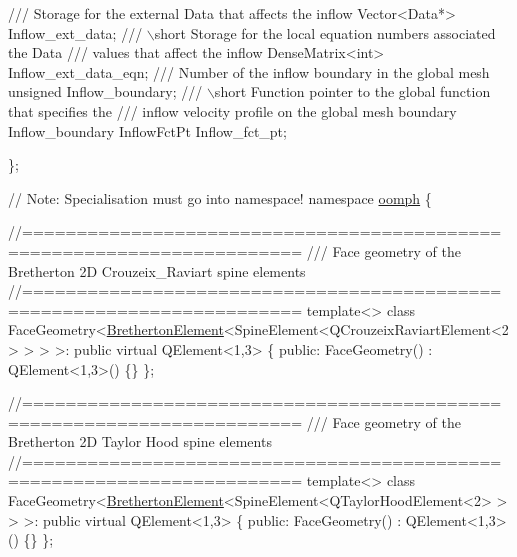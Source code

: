 \begin{DoxyCodeInclude}
\textcolor{comment}{}
\textcolor{comment}{ /// Storage for the external Data that affects the inflow}
\textcolor{comment}{} Vector<Data*> Inflow\_ext\_data;
\textcolor{comment}{}
\textcolor{comment}{ /// \(\backslash\)short Storage for the local equation numbers associated the Data}
\textcolor{comment}{ /// values that affect the inflow}
\textcolor{comment}{} DenseMatrix<int> Inflow\_ext\_data\_eqn;
\textcolor{comment}{}
\textcolor{comment}{ /// Number of the inflow boundary in the global mesh}
\textcolor{comment}{} \textcolor{keywordtype}{unsigned} Inflow\_boundary;
\textcolor{comment}{}
\textcolor{comment}{ /// \(\backslash\)short Function pointer to the global function that specifies the}
\textcolor{comment}{ /// inflow velocity profile on the global mesh boundary Inflow\_boundary}
\textcolor{comment}{} InflowFctPt Inflow\_fct\_pt;

\};



\textcolor{comment}{// Note: Specialisation must go into namespace!}
\textcolor{keyword}{namespace }\hyperlink{namespaceoomph}{oomph}
\{

\textcolor{comment}{//=======================================================================}\textcolor{comment}{}
\textcolor{comment}{/// Face geometry of the Bretherton 2D Crouzeix\_Raviart spine elements}
\textcolor{comment}{}\textcolor{comment}{//=======================================================================}
\textcolor{keyword}{template}<>
\textcolor{keyword}{class }FaceGeometry<\hyperlink{classBrethertonElement}{BrethertonElement}<SpineElement<QCrouzeixRaviartElement<2> > > >: \textcolor{keyword}{public}
       \textcolor{keyword}{virtual} QElement<1,3>
\{
  \textcolor{keyword}{public}:
 FaceGeometry() : QElement<1,3>() \{\}
\};



\textcolor{comment}{//=======================================================================}\textcolor{comment}{}
\textcolor{comment}{/// Face geometry of the Bretherton 2D Taylor Hood spine elements}
\textcolor{comment}{}\textcolor{comment}{//=======================================================================}
\textcolor{keyword}{template}<>
\textcolor{keyword}{class }FaceGeometry<\hyperlink{classBrethertonElement}{BrethertonElement}<SpineElement<QTaylorHoodElement<2> > > >: \textcolor{keyword}{public} \textcolor{keyword}{
      virtual} QElement<1,3>
\{
  \textcolor{keyword}{public}:
 FaceGeometry() : QElement<1,3>() \{\}
\};



\end{DoxyCodeInclude}
